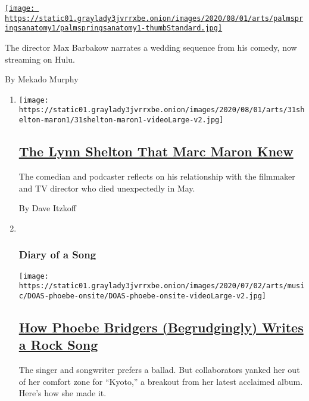 \begin{enumerate}
\begin{enumerate}
    \href{/2020/07/31/movies/palm-springs-clip-hulu.html}{\texttt{[image: https://static01.graylady3jvrrxbe.onion/images/2020/08/01/arts/palmspringsanatomy1/palmspringsanatomy1-thumbStandard.jpg]}}

    The director Max Barbakow narrates a wedding sequence from his
    comedy, now streaming on Hulu.

    By Mekado Murphy
  \end{enumerate}
\end{enumerate}

\begin{enumerate}
\def\labelenumi{\arabic{enumi}.}
\item
  \texttt{[image: https://static01.graylady3jvrrxbe.onion/images/2020/08/01/arts/31shelton-maron1/31shelton-maron1-videoLarge-v2.jpg]}

  \hypertarget{the-lynn-shelton-that-marc-maron-knew}{%
  \subsection{\texorpdfstring{\href{/2020/07/31/movies/marc-maron-lynn-shelton.html}{The
  Lynn Shelton That Marc Maron
  Knew}}{The Lynn Shelton That Marc Maron Knew}}\label{the-lynn-shelton-that-marc-maron-knew}}

  The comedian and podcaster reflects on his relationship with the
  filmmaker and TV director who died unexpectedly in May.

  By Dave Itzkoff
\item ~
  \hypertarget{diary-of-a-song}{%
  \subsubsection{Diary of a Song}\label{diary-of-a-song}}

  \texttt{[image: https://static01.graylady3jvrrxbe.onion/images/2020/07/02/arts/music/DOAS-phoebe-onsite/DOAS-phoebe-onsite-videoLarge-v2.jpg]}

  \hypertarget{how-phoebe-bridgers-begrudgingly-writes-a-rock-song}{%
  \subsection{\texorpdfstring{\href{/2020/07/30/arts/music/phoebe-bridgers-kyoto.html}{How
  Phoebe Bridgers (Begrudgingly) Writes a Rock
  Song}}{How Phoebe Bridgers (Begrudgingly) Writes a Rock Song}}\label{how-phoebe-bridgers-begrudgingly-writes-a-rock-song}}

  The singer and songwriter prefers a ballad. But collaborators yanked
  her out of her comfort zone for ``Kyoto,'' a breakout from her latest
  acclaimed album. Here's how she made it.


\end{enumerate}
